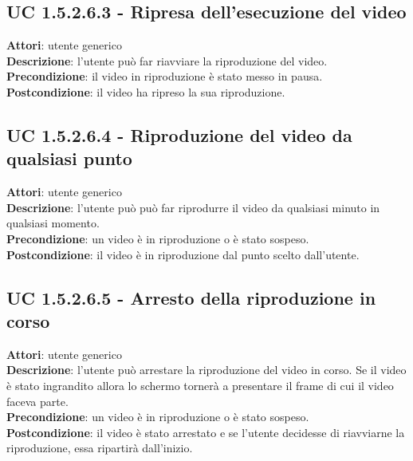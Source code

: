 	\subsection{UC 1.5.2.6.3 - Ripresa dell'esecuzione del video}{
		\label{uc1.5.2.6.3}
		\textbf{Attori}: utente generico \\
		\textbf{Descrizione}: l'utente può far riavviare la riproduzione del video. \\
		\textbf{Precondizione}: il video in riproduzione è stato messo in pausa.	\\
		\textbf{Postcondizione}: il video ha ripreso la sua riproduzione.	\\
	}
	\subsection{UC 1.5.2.6.4 - Riproduzione del video da qualsiasi punto}{
		\label{uc1.5.2.6.4}
		\textbf{Attori}: utente generico \\
		\textbf{Descrizione}: l'utente può può far riprodurre il video da qualsiasi minuto in qualsiasi momento. \\
		\textbf{Precondizione}: un video è in riproduzione o è stato sospeso.	\\
		\textbf{Postcondizione}: il video è in riproduzione dal punto scelto dall'utente.	\\
	}
	\subsection{UC 1.5.2.6.5 - Arresto della riproduzione in corso}{
		\label{uc1.5.2.6.5}
		\textbf{Attori}: utente generico \\
		\textbf{Descrizione}: l'utente può arrestare la riproduzione del video in corso. Se il video è stato ingrandito allora lo schermo tornerà a presentare il frame di cui il video faceva parte. \\
		\textbf{Precondizione}: un video è in riproduzione o è stato sospeso.	\\
		\textbf{Postcondizione}: il video è stato arrestato e se l'utente decidesse di riavviarne la riproduzione, essa ripartirà dall'inizio.	\\
	}
